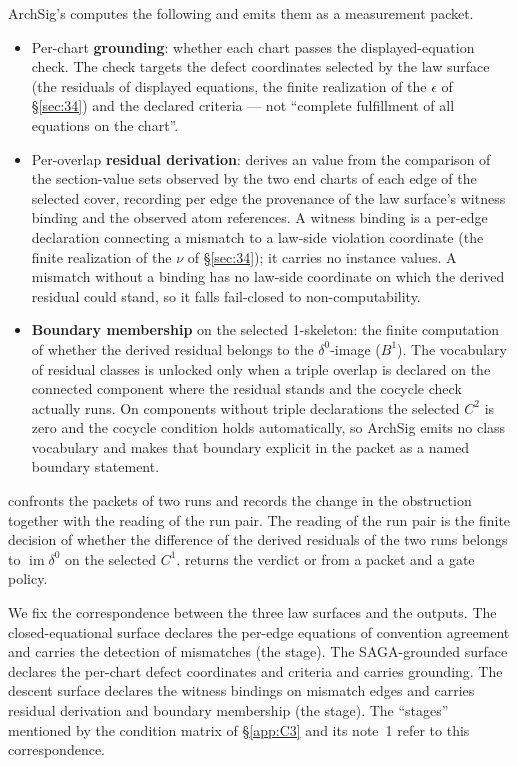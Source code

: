 ArchSig's  computes the following and emits them as a
measurement packet.
\begin{itemize}
\item Per-chart \textbf{grounding}: whether each chart passes the
displayed-equation check. The check targets the defect coordinates
selected by the law surface (the residuals of displayed equations, the
finite realization of the $\epsilon$ of \S\ref{sec:34}) and the
declared criteria --- not ``complete fulfillment of all equations on
the chart''.
\item Per-overlap \textbf{residual derivation}: derives an 
value from the comparison of the section-value sets observed by the
two end charts of each edge of the selected cover, recording per edge
the provenance of the law surface's witness binding and the observed
atom references. A witness binding is a per-edge declaration
connecting a mismatch to a law-side violation coordinate (the finite
realization of the $\nu$ of \S\ref{sec:34}); it carries no instance
values. A mismatch without a binding has no law-side coordinate on
which the derived residual could stand, so it falls fail-closed to
non-computability.
\item \textbf{Boundary membership} on the selected 1-skeleton: the
finite  computation of whether the derived residual belongs
to the $\delta^0$-image ($B^1$). The vocabulary of residual classes is
unlocked only when a triple overlap is declared on the connected
component where the residual stands and the cocycle check actually
runs. On components without triple declarations the selected $C^2$ is
zero and the cocycle condition holds automatically, so ArchSig emits
no class vocabulary and makes that boundary explicit in the packet as
a named boundary statement.
\end{itemize}

 confronts the packets of two runs and records the
change in the obstruction together with the reading of the run pair.
The reading of the run pair is the finite  decision of
whether the difference of the derived residuals of the two runs
belongs to $\operatorname{im}\delta^0$ on the selected $C^1$.
 returns the verdict  or
 from a packet and a gate policy.

We fix the correspondence between the three law surfaces and the
outputs. The closed-equational surface declares the per-edge equations
of convention agreement and carries the detection of mismatches (the
 stage). The SAGA-grounded surface declares the per-chart defect
coordinates and criteria and carries grounding. The descent surface
declares the witness bindings on mismatch edges and carries residual
derivation and boundary membership (the  stage). The
``stages'' mentioned by the condition matrix of \S\ref{app:C3} and its
note~1 refer to this correspondence.

